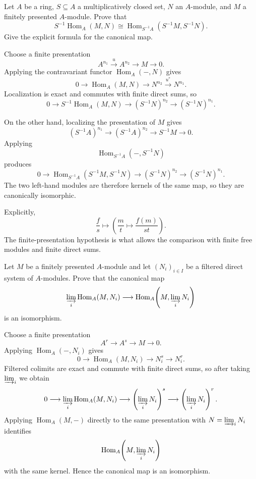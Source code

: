 \begin{problem}[CP-V-0023]
\label{prob:cp-v-0023}
Let \(A\) be a ring, \(S\subseteq A\) a multiplicatively closed set, \(N\) an
\(A\)-module, and \(M\) a finitely presented \(A\)-module. Prove that
\[
S^{-1}\!\operatorname{Hom}_A(M,N)
\cong
\operatorname{Hom}_{S^{-1}A}(S^{-1}M,S^{-1}N).
\]
Give the explicit formula for the canonical map.
\end{problem}

\begin{solution}
Choose a finite presentation
\[
A^{n_1}\xrightarrow{u}A^{n_2}\longrightarrow M\longrightarrow0.
\]
Applying the contravariant functor \(\operatorname{Hom}_A(-,N)\) gives
\[
0\longrightarrow\operatorname{Hom}_A(M,N)
\longrightarrow N^{n_2}
\xrightarrow{u^*}
N^{n_1}.
\]
Localization is exact and commutes with finite direct sums, so
\[
0\longrightarrow
S^{-1}\operatorname{Hom}_A(M,N)
\longrightarrow
(S^{-1}N)^{n_2}
\longrightarrow
(S^{-1}N)^{n_1}.
\]

On the other hand, localizing the presentation of \(M\) gives
\[
(S^{-1}A)^{n_1}
\longrightarrow
(S^{-1}A)^{n_2}
\longrightarrow
S^{-1}M
\longrightarrow0.
\]
Applying
\[
\operatorname{Hom}_{S^{-1}A}(-,S^{-1}N)
\]
produces
\[
0\longrightarrow
\operatorname{Hom}_{S^{-1}A}(S^{-1}M,S^{-1}N)
\longrightarrow
(S^{-1}N)^{n_2}
\longrightarrow
(S^{-1}N)^{n_1}.
\]
The two left-hand modules are therefore kernels of the same map, so they are
canonically isomorphic.

Explicitly,
\[
\frac{f}{s}
\longmapsto
\left(
\frac{m}{t}\longmapsto\frac{f(m)}{st}
\right).
\]
The finite-presentation hypothesis is what allows the comparison with finite
free modules and finite direct sums.
\end{solution}


\begin{problem}[CP-V-0105]
\label{prob:cp-v-0105}
Let \(M\) be a finitely presented \(A\)-module and let \((N_i)_{i\in I}\) be a filtered direct system of \(A\)-modules. Prove that the canonical map
\[
\varinjlim_i \operatorname{Hom}_A(M,N_i)
\longrightarrow
\operatorname{Hom}_A\!\left(M,\varinjlim_i N_i\right)
\]
is an isomorphism.
\end{problem}

\begin{solution}
Choose a finite presentation
\[
A^r\longrightarrow A^s\longrightarrow M\longrightarrow0.
\]
Applying \(\operatorname{Hom}_A(-,N_i)\) gives
\[
0\longrightarrow\operatorname{Hom}_A(M,N_i)
\longrightarrow N_i^s\longrightarrow N_i^r.
\]
Filtered colimits are exact and commute with finite direct sums, so after taking \(\varinjlim_i\) we obtain
\[
0\longrightarrow\varinjlim_i\operatorname{Hom}_A(M,N_i)
\longrightarrow \left(\varinjlim_iN_i\right)^s
\longrightarrow \left(\varinjlim_iN_i\right)^r.
\]
Applying \(\operatorname{Hom}_A(M,-)\) directly to the same presentation with \(N=\varinjlim_iN_i\) identifies
\[
\operatorname{Hom}_A\!\left(M,\varinjlim_iN_i\right)
\]
with the same kernel. Hence the canonical map is an isomorphism.
\end{solution}



